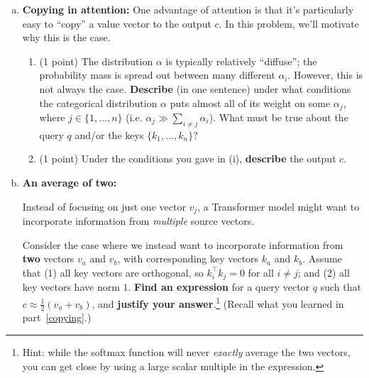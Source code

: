 \begin{enumerate}[(a)]


\item {} \label{copying} \textbf{Copying in attention:} One advantage of attention is that it's particularly easy to ``copy'' a value vector to the output $c$. In this problem, we'll motivate why this is the case.


\begin{enumerate}[label=\roman*.]
    \item (1 point) The distribution $\alpha$ is typically relatively ``diffuse''; the probability mass is spread out between many different $\alpha_i$. However, this is not always the case. \textbf{Describe} (in one sentence) under what conditions the categorical distribution $\alpha$ puts almost all of its weight on some $\alpha_j$, where $j \in \{1, \ldots, n\}$ (i.e. $\alpha_j \gg \sum_{i \neq j} \alpha_i$). What must be true about the query $q$ and/or the keys $\{k_1,\dots,k_n\}$?
    
    \item (1 point) Under the conditions you gave in (i), \textbf{describe} the output $c$. 
\end{enumerate}

\item {} \textbf{An average of two:}

Instead of focusing on just one vector $v_j$, a Transformer model might want to incorporate information from \textit{multiple} source vectors.

Consider the case where we instead want to incorporate information from \textbf{two} vectors $v_a$ and $v_b$, with corresponding key vectors $k_a$ and $k_b$.
Assume that (1) all key vectors are orthogonal, so $k_i^\top k_j = 0$ for all $i \neq j$; and (2) all key vectors have norm $1$.
\textbf{Find an expression} for a query vector $q$ such that $c \approx \frac{1}{2}(v_a + v_b)$, and \textbf{justify your answer}.\footnote{Hint: while the softmax function will never \textit{exactly} average the two vectors, you can get close by using a large scalar multiple in the expression.} (Recall what you learned in part~\ref{copying}.)



\end{enumerate}

